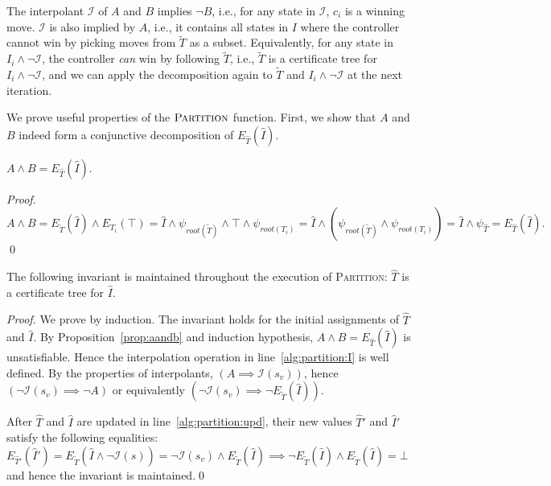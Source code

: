 The interpolant $\mathcal{I}$ of $A$ and $B$
implies $\neg B$, i.e., for any state in $\mathcal{I}$, $c_i$ is a winning move.
$\mathcal{I}$ is also implied by $A$, i.e., it contains all states in $I$ where
the controller cannot win by picking moves from $\tilde{T}$ as a subset.
Equivalently, for any state in $I_i \land \neg \mathcal{I}$, the controller \emph{can}
win by following $\tilde{T}$, i.e., $\tilde{T}$ is a certificate tree for
$I_i \land \neg \mathcal{I}$, and we can apply the decomposition
again to $\tilde{T}$ and $I_i \land \neg \mathcal{I}$
at the next iteration.

We prove useful properties of the $\textsc{Partition}$ function.  First, we show that $A$ and
$B$ indeed form a conjunctive decomposition of $E_{\hat{T}}(\hat{I})$.
\begin{proposition}\label{prop:aandb}
    $A\land B = E_{\hat{T}}(\hat{I})$.
\end{proposition}
\begin{proof}
$A\land B = E_{\tilde{T}}(\hat{I}) \land E_{T_i}(\top) =
\hat{I} \land \psi_{root(\tilde{T})} \land \top \land \psi_{root(T_i)} =
\hat{I} \land (\psi_{root(\tilde{T})}\! \land\! \psi_{root(T_i)}) =
\hat{I}\! \land\! \psi_{\hat{T}} = E_{\hat{T}}(\hat{I}).$
\qed
\end{proof}

\begin{proposition}
    The following invariant is maintained throughout the execution of
    \textsc{Partition}: $\hat{T}$ is a certificate tree for $\hat{I}$.
\end{proposition}
\begin{proof}
We prove by induction.  The invariant holds for the initial
assignments of $\hat{T}$ and $\hat{I}$.
By Proposition~\ref{prop:aandb} and induction hypothesis, $A\land B =
E_{\hat{T}}(\hat{I})$ is unsatisfiable.  Hence the interpolation
operation in line~\ref{alg:partition:I} is well defined.  By the
properties of interpolants, $(A\implies\mathcal{I}(s_v))$, hence
$(\neg\mathcal{I}(s_v) \implies \neg A)$ or equivalently
$(\neg\mathcal{I}(s_v) \implies \neg E_{\tilde{T}}(\hat{I}))$.

After $\hat{T}$ and $\hat{I}$ are updated in
line~\ref{alg:partition:upd}, their new values $\hat{T}'$ and
$\hat{I}'$ satisfy the following equalities:
$E_{\hat{T}'}(\hat{I}') = E_{\tilde{T}}(\hat{I} \land
\neg\mathcal{I}(s)) = \neg\mathcal{I}(s_v) \land
E_{\tilde{T}}(\hat{I}) \implies \neg E_{\tilde{T}}(\hat{I}) \land
E_{\tilde{T}}(\hat{I}) = \bot$ and hence the invariant is
maintained.\qed
\end{proof}

